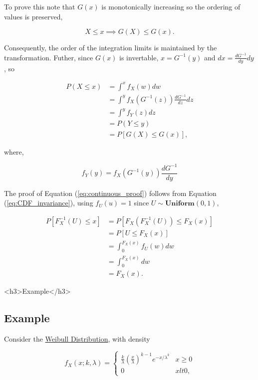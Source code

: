 \documentclass[12pt]{article}
\begin{document}
To prove this note that $G(x)$ is monotonically increasing so the ordering of values is preserved,

$$ X \le x \implies G(X) \le G(x).$$

Consequently, the order of the integration limits is maintained by the transformation. Futher, since $G(x)$ is invertable,
$x = G^{-1}(y)$ and $dx = \frac{dG^{-1}}{dy} dy$, so

$$
\begin{aligned}
P(X \leq x) & = \int^{x} f_X(w) dw \\
& = \int^{y} f_X(G^{-1}(z)) \frac{dG^{-1}}{dz} dz \\
& = \int^{y} f_Y(z) dz \\
& = P(Y \leq y) \\
& = P[G(X) \leq G(x)],
\end{aligned}
$$

where,

$$ f_Y(y) = f_X(G^{-1}(y)) \frac{dG^{-1}}{dy} $$

The proof of Equation (\ref{eq:continuous_proof}) follows from Equation (\ref{eq:CDF_invariance}), using $f_U(u) = 1$
since $U \sim \textbf{Uniform}(0, 1),$

$$
\begin{aligned}
P[F_X^{-1}(U) \leq x] & = P[F_X(F_X^{-1}(U)) \leq F_X(x)] \\
& = P[U \leq F_X(x)] \\
& = \int_{0}^{F_X(x)} f_U(w) dw \\
& = \int_{0}^{F_X(x)} dw \\
& = F_X(x).
\end{aligned}
$$

\ifblog
<h3>Example</h3>
\fi
\iftex
\subsection{Example}
\fi

Consider the \href{https://en.wikipedia.org/wiki/Weibull_distribution}{Weibull Distribution}, with density

\begin{equation}
\label{eq:Weibull_distribution}
f_X(x; k, \lambda) =
\begin{cases}
\frac{k}{\lambda}\left(\frac{x}{\lambda} \right)^{k-1} e^{{-x/\lambda}^k} & x \geq 0 \\
0 & x lt 0,
\end{cases}
\end{equation}
\end{document}
